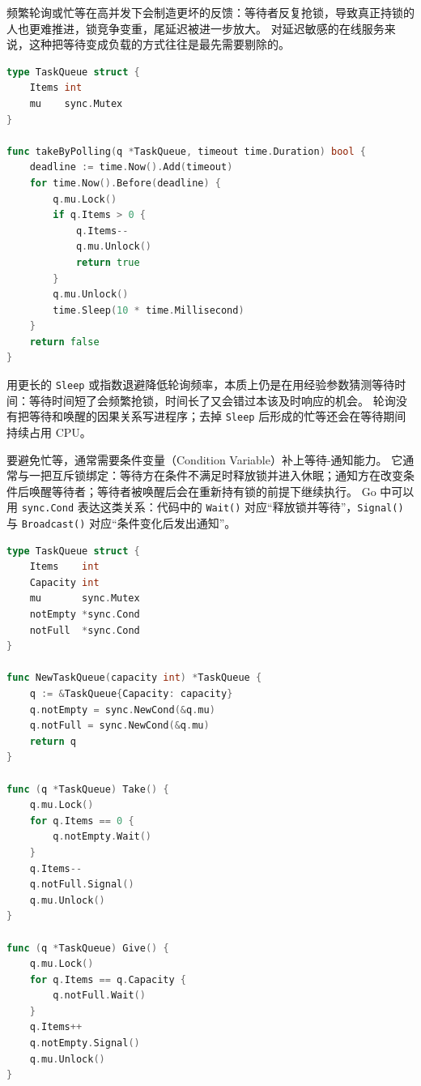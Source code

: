 频繁轮询或忙等在高并发下会制造更坏的反馈：等待者反复抢锁，导致真正持锁的人也更难推进，锁竞争变重，尾延迟被进一步放大。
对延迟敏感的在线服务来说，这种把等待变成负载的方式往往是最先需要剔除的。

\begin{tcolorbox}[title=互斥锁 + 定期轮询（反例示意）]
\begin{lstlisting}[style=codeblock, language=go]
type TaskQueue struct {
    Items int
    mu    sync.Mutex
}

func takeByPolling(q *TaskQueue, timeout time.Duration) bool {
    deadline := time.Now().Add(timeout)
    for time.Now().Before(deadline) {
        q.mu.Lock()
        if q.Items > 0 {
            q.Items--
            q.mu.Unlock()
            return true
        }
        q.mu.Unlock()
        time.Sleep(10 * time.Millisecond)
    }
    return false
}
\end{lstlisting}
\end{tcolorbox}

用更长的 \texttt{Sleep} 或指数退避降低轮询频率，本质上仍是在用经验参数猜测等待时间：等待时间短了会频繁抢锁，时间长了又会错过本该及时响应的机会。
轮询没有把等待和唤醒的因果关系写进程序；去掉 \texttt{Sleep} 后形成的忙等还会在等待期间持续占用 CPU。

要避免忙等，通常需要条件变量（Condition Variable）补上等待-通知能力。
它通常与一把互斥锁绑定：等待方在条件不满足时释放锁并进入休眠；通知方在改变条件后唤醒等待者；等待者被唤醒后会在重新持有锁的前提下继续执行。
Go 中可以用 \texttt{sync.Cond} 表达这类关系：代码中的 \texttt{Wait()} 对应“释放锁并等待”，\texttt{Signal()} 与 \texttt{Broadcast()} 对应“条件变化后发出通知”。

\begin{tcolorbox}[title=使用 sync.Cond 实现等待-通知（示意）]
\begin{lstlisting}[style=codeblock, language=go]
type TaskQueue struct {
    Items    int
    Capacity int
    mu       sync.Mutex
    notEmpty *sync.Cond
    notFull  *sync.Cond
}

func NewTaskQueue(capacity int) *TaskQueue {
    q := &TaskQueue{Capacity: capacity}
    q.notEmpty = sync.NewCond(&q.mu)
    q.notFull = sync.NewCond(&q.mu)
    return q
}

func (q *TaskQueue) Take() {
    q.mu.Lock()
    for q.Items == 0 {
        q.notEmpty.Wait()
    }
    q.Items--
    q.notFull.Signal()
    q.mu.Unlock()
}

func (q *TaskQueue) Give() {
    q.mu.Lock()
    for q.Items == q.Capacity {
        q.notFull.Wait()
    }
    q.Items++
    q.notEmpty.Signal()
    q.mu.Unlock()
}
\end{lstlisting}
\end{tcolorbox}

